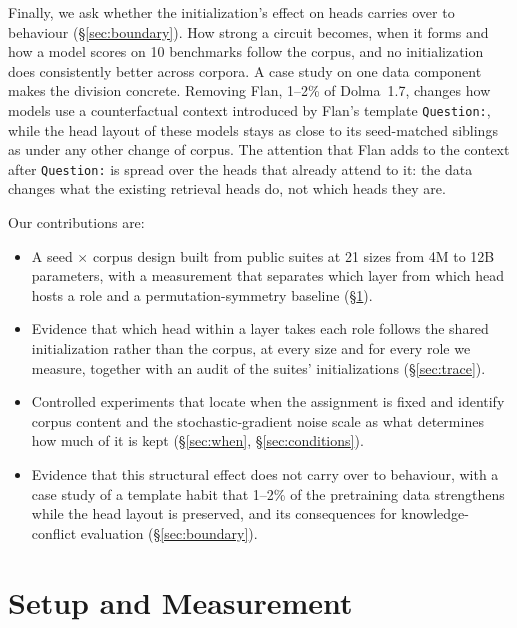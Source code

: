 \documentclass[11pt]{article}
\newcommand{\tmpl}[1]{\texttt{#1}}
\begin{document}
Finally, we ask whether the initialization's effect on heads carries over to behaviour (\S\ref{sec:boundary}).
How strong a circuit becomes, when it forms and how a model scores on 10 benchmarks follow the corpus, and no initialization does consistently better across corpora.
A case study on one data component makes the division concrete.
Removing Flan, 1--2\% of Dolma~1.7, changes how models use a counterfactual context introduced by Flan's template \tmpl{Question:}, while the head layout of these models stays as close to its seed-matched siblings as under any other change of corpus.
The attention that Flan adds to the context after \tmpl{Question:} is spread over the heads that already attend to it: the data changes what the existing retrieval heads do, not which heads they are.

Our contributions are:
\begin{itemize}[leftmargin=*,itemsep=1pt,topsep=2pt]
  \item A seed $\times$ corpus design built from public suites at 21 sizes from 4M to 12B parameters, with a measurement that separates which layer from which head hosts a role and a permutation-symmetry baseline (\S\ref{sec:setup}).
  \item Evidence that which head within a layer takes each role follows the shared initialization rather than the corpus, at every size and for every role we measure, together with an audit of the suites' initializations (\S\ref{sec:trace}).
  \item Controlled experiments that locate when the assignment is fixed and identify corpus content and the stochastic-gradient noise scale as what determines how much of it is kept (\S\ref{sec:when}, \S\ref{sec:conditions}).
  \item Evidence that this structural effect does not carry over to behaviour, with a case study of a template habit that 1--2\% of the pretraining data strengthens while the head layout is preserved, and its consequences for knowledge-conflict evaluation (\S\ref{sec:boundary}).
\end{itemize}

\section{Setup and Measurement}
\label{sec:setup}
\end{document}
